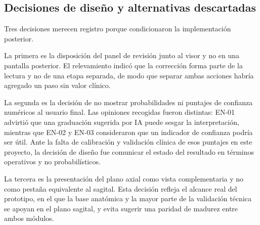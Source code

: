 \subsection{Decisiones de diseño y alternativas descartadas}

Tres decisiones merecen registro porque condicionaron la implementación posterior.

La primera es la disposición del panel de revisión junto al visor y no en una pantalla posterior. El relevamiento indicó que la corrección forma parte de la lectura y no de una etapa separada, de modo que separar ambas acciones habría agregado un paso sin valor clínico.

La segunda es la decisión de no mostrar probabilidades ni puntajes de confianza numéricos al usuario final. Las opiniones recogidas fueron distintas: EN-01 advirtió que una graduación sugerida por IA puede sesgar la interpretación, mientras que EN-02 y EN-03 consideraron que un indicador de confianza podría ser útil. Ante la falta de calibración y validación clínica de esos puntajes en este proyecto, la decisión de diseño fue comunicar el estado del resultado en términos operativos y no probabilísticos.

La tercera es la presentación del plano axial como vista complementaria y no como pestaña equivalente al sagital. Esta decisión refleja el alcance real del prototipo, en el que la base anatómica y la mayor parte de la validación técnica se apoyan en el plano sagital, y evita sugerir una paridad de madurez entre ambos módulos.
